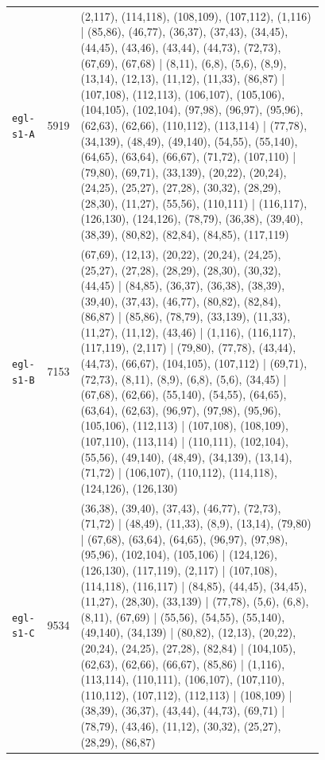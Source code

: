 \begin{landscape}
\begin{longtable}{lr>{\tiny\raggedright\arraybackslash}p{0.78\linewidth}}
\texttt{egl-s1-A} & 5919 & (2,117), (114,118), (108,109), (107,112), (1,116) | (85,86), (46,77), (36,37), (37,43), (34,45), (44,45), (43,46), (43,44), (44,73), (72,73), (67,69), (67,68) | (8,11), (6,8), (5,6), (8,9), (13,14), (12,13), (11,12), (11,33), (86,87) | (107,108), (112,113), (106,107), (105,106), (104,105), (102,104), (97,98), (96,97), (95,96), (62,63), (62,66), (110,112), (113,114) | (77,78), (34,139), (48,49), (49,140), (54,55), (55,140), (64,65), (63,64), (66,67), (71,72), (107,110) | (79,80), (69,71), (33,139), (20,22), (20,24), (24,25), (25,27), (27,28), (30,32), (28,29), (28,30), (11,27), (55,56), (110,111) | (116,117), (126,130), (124,126), (78,79), (36,38), (39,40), (38,39), (80,82), (82,84), (84,85), (117,119) \\[2pt]
\texttt{egl-s1-B} & 7153 & (67,69), (12,13), (20,22), (20,24), (24,25), (25,27), (27,28), (28,29), (28,30), (30,32), (44,45) | (84,85), (36,37), (36,38), (38,39), (39,40), (37,43), (46,77), (80,82), (82,84), (86,87) | (85,86), (78,79), (33,139), (11,33), (11,27), (11,12), (43,46) | (1,116), (116,117), (117,119), (2,117) | (79,80), (77,78), (43,44), (44,73), (66,67), (104,105), (107,112) | (69,71), (72,73), (8,11), (8,9), (6,8), (5,6), (34,45) | (67,68), (62,66), (55,140), (54,55), (64,65), (63,64), (62,63), (96,97), (97,98), (95,96), (105,106), (112,113) | (107,108), (108,109), (107,110), (113,114) | (110,111), (102,104), (55,56), (49,140), (48,49), (34,139), (13,14), (71,72) | (106,107), (110,112), (114,118), (124,126), (126,130) \\[2pt]
\texttt{egl-s1-C} & 9534 & (36,38), (39,40), (37,43), (46,77), (72,73), (71,72) | (48,49), (11,33), (8,9), (13,14), (79,80) | (67,68), (63,64), (64,65), (96,97), (97,98), (95,96), (102,104), (105,106) | (124,126), (126,130), (117,119), (2,117) | (107,108), (114,118), (116,117) | (84,85), (44,45), (34,45), (11,27), (28,30), (33,139) | (77,78), (5,6), (6,8), (8,11), (67,69) | (55,56), (54,55), (55,140), (49,140), (34,139) | (80,82), (12,13), (20,22), (20,24), (24,25), (27,28), (82,84) | (104,105), (62,63), (62,66), (66,67), (85,86) | (1,116), (113,114), (110,111), (106,107), (107,110), (110,112), (107,112), (112,113) | (108,109) | (38,39), (36,37), (43,44), (44,73), (69,71) | (78,79), (43,46), (11,12), (30,32), (25,27), (28,29), (86,87) \\[2pt]

\end{longtable}
\end{landscape}
